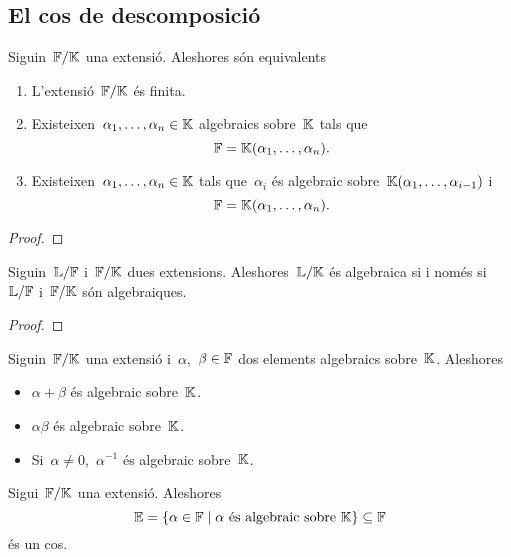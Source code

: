 \documentclass[../Apunts.tex]{subfiles}
\begin{document}
\subsection{El cos de descomposició}
	\begin{lemma}
		\label{lema:condicions equivalents a extensió finita}
		Siguin~\(\mathbb{F}/\mathbb{K}\) una extensió. Aleshores són equivalents
		\begin{enumerate}
		\item L'extensió~\(\mathbb{F}/\mathbb{K}\) és finita.
		\item Existeixen~\(\alpha_{1},\dots,\alpha_{n}\in\mathbb{K}\) algebraics sobre~\(\mathbb{K}\) tals que
		\[\mathbb{F}=\mathbb{K}(\alpha_{1},\dots,\alpha_{n}).\]
		\item Existeixen~\(\alpha_{1},\dots,\alpha_{n}\in\mathbb{K}\) tals que~\(\alpha_{i}\) és algebraic sobre~\(\mathbb{K}(\alpha_{1},\dots,\alpha_{i-1})\) i
		\[\mathbb{F}=\mathbb{K}(\alpha_{1},\dots,\alpha_{n}).\]
		\end{enumerate}
	\end{lemma}
	\begin{proof}
	\end{proof}
	\begin{theorem}
		\label{thm:teorema de les extensions algebraiques}
		Siguin~\(\mathbb{L}/\mathbb{F}\) i~\(\mathbb{F}/\mathbb{K}\) dues extensions. Aleshores~\(\mathbb{L}/\mathbb{K}\) és algebraica
		si i només si~\(\mathbb{L}/\mathbb{F}\) i~\(\mathbb{F}/\mathbb{K}\) són algebraiques.
	\end{theorem}
	\begin{proof}
	\end{proof}
	\begin{theorem}
		\label{thm:els nombres algebraics són un cos}
		Siguin~\(\mathbb{F}/\mathbb{K}\) una extensió i~\(\alpha\),~\(\beta\in\mathbb{F}\) dos elements algebraics sobre~\(\mathbb{K}\). Aleshores
		\begin{itemize}
		\item \(\alpha+\beta\) és algebraic sobre~\(\mathbb{K}\).
		\item \(\alpha\beta\) és algebraic sobre~\(\mathbb{K}\).
		\item Si~\(\alpha\neq0\),~\(\alpha^{-1}\) és algebraic sobre~\(\mathbb{K}\).
		\end{itemize}
	\end{theorem}
	\begin{corollary}
		\label{cor:els nombres algebraics són un cos}
		Sigui~\(\mathbb{F}/\mathbb{K}\) una extensió. Aleshores
		\[\mathbb{E}=\{\alpha\in\mathbb{F}\mid\alpha\text{ és algebraic sobre }\mathbb{K}\}\subseteq\mathbb{F}\]
		és un cos.
	\end{corollary}
\end{document}
